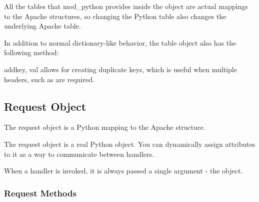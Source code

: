 All the tables that mod_python provides inside the 
object are actual mappings to the Apache structures, so changing the
Python table also changes the underlying Apache table.

In addition to normal dictionary-like behavior, the table object also
has the following method:

\begin{methoddesc}[table]{add}{key, val}
 allows for creating duplicate keys, which is useful 
when multiple headers, such as  are required.
\end{methoddesc}

\subsection{Request Object\label{pyapi-mprequest}}

The request object is a Python mapping to the Apache
 structure. 

The request object is a real Python object. You can dynamically
assign attributes to it as a way to communicate between handlers.

When a handler is invoked, it is always passed a single argument - the
 object.

\subsubsection{Request Methods\label{pyapi-mprequest-meth}}


